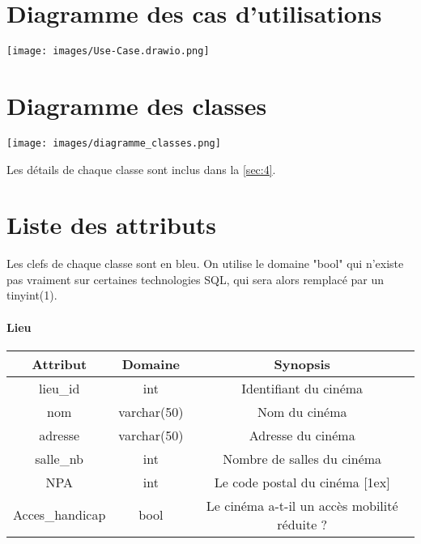 \documentclass[12pt]{article}
\begin{document}
\pagebreak
\section{Diagramme des cas d'utilisations}
\texttt{[image: images/Use-Case.drawio.png]}
\pagebreak
\section{Diagramme des classes}
\begin{center}
    \texttt{[image: images/diagramme\_classes.png]} \\
\end{center}
Les détails de chaque classe sont inclus dans la \autoref{sec:4}.
\pagebreak
\section{Liste des attributs}
Les clefs de chaque classe sont en {\color{blue} bleu}. On utilise le domaine "bool" qui n'existe pas vraiment
sur certaines technologies SQL, qui sera alors remplacé par un tinyint(1).
\label{sec:4}
\paragraph*{Lieu}
\begin{center}
    \begin{tabular}{||c c c||} 
     \hline
     Attribut & Domaine & Synopsis\\ [0.5ex] 
     \hline\hline
     {\color{blue} lieu{\_}id} & int & Identifiant du cinéma \\ 
     \hline
     nom & varchar(50) & Nom du cinéma \\
    \hline
    adresse & varchar(50) & Adresse du cinéma \\
     \hline
     salle{\_}nb & int & Nombre de salles du cinéma\\
     \hline
     NPA & int & Le code postal du cinéma [1ex] \\
     \hline
     Acces{\_}handicap & bool & Le cinéma a-t-il un accès mobilité réduite ? \\
     \hline
    \end{tabular}
\end{center}
\end{document}
